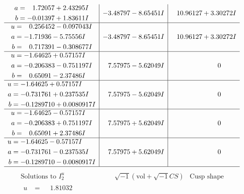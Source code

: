 \documentclass[1p]{elsarticle_modified}
\theoremstyle{definition}
\newcommand{\I}{\sqrt{-1}}
\begin{document}
$$\begin{array}{c|c|c}
\begin{aligned}
a &= \phantom{-}1.72057 + 2.43295 I \\
b &= -0.01397 + 1.83611 I\end{aligned}
 & -3.48797 - 8.65451 I & \phantom{-}10.96127 + 3.30272 I \\ \hline\begin{aligned}
u &= \phantom{-}0.256452 - 0.097043 I \\
a &= -1.71936 - 5.75556 I \\
b &= \phantom{-}0.717391 - 0.308677 I\end{aligned}
 & -3.48797 - 8.65451 I & \phantom{-}10.96127 + 3.30272 I \\ \hline\begin{aligned}
u &= -1.64625 + 0.57157 I \\
a &= -0.206383 - 0.751197 I \\
b &= \phantom{-}0.65091 - 2.37486 I\end{aligned}
 & \phantom{-}7.57975 - 5.62049 I & \phantom{-0.000000 } 0 \\ \hline\begin{aligned}
u &= -1.64625 + 0.57157 I \\
a &= -0.731761 + 0.237535 I \\
b &= -0.1289710 + 0.0080917 I\end{aligned}
 & \phantom{-}7.57975 - 5.62049 I & \phantom{-0.000000 } 0 \\ \hline\begin{aligned}
u &= -1.64625 - 0.57157 I \\
a &= -0.206383 + 0.751197 I \\
b &= \phantom{-}0.65091 + 2.37486 I\end{aligned}
 & \phantom{-}7.57975 + 5.62049 I & \phantom{-0.000000 } 0 \\ \hline\begin{aligned}
u &= -1.64625 - 0.57157 I \\
a &= -0.731761 - 0.237535 I \\
b &= -0.1289710 - 0.0080917 I\end{aligned}
 & \phantom{-}7.57975 + 5.62049 I & \phantom{-0.000000 } 0\\
 \hline 
 \end{array}$$\newpage$$\begin{array}{c|c|c}  
\text{Solutions to }I^u_{2}& \I (\text{vol} + \sqrt{-1}CS) & \text{Cusp shape}\\
 \hline 
\begin{aligned}
u &= \phantom{-}1.81032\phantom{ +0.000000I} \\

\end{aligned}
\end{array}$$
\end{document}
